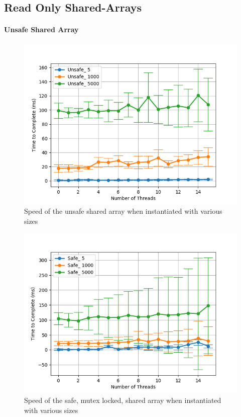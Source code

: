 \documentclass[11pt]{article}
\begin{document}
\subsection{Read Only Shared-Arrays}
\paragraph{Unsafe Shared Array}

\begin{figure}\label{fig:step3_1}
\centering
\includegraphics[scale=0.65]{step3_1.png}
\caption{Speed of the unsafe shared array when instantiated with various sizes}
\end{figure}


\begin{figure}\label{fig:step3_2}
\centering
\includegraphics[scale=0.65]{step3_2.png}
\caption{Speed of the safe, mutex locked, shared array when instantiated with various sizes}
\end{figure}
\end{document}
